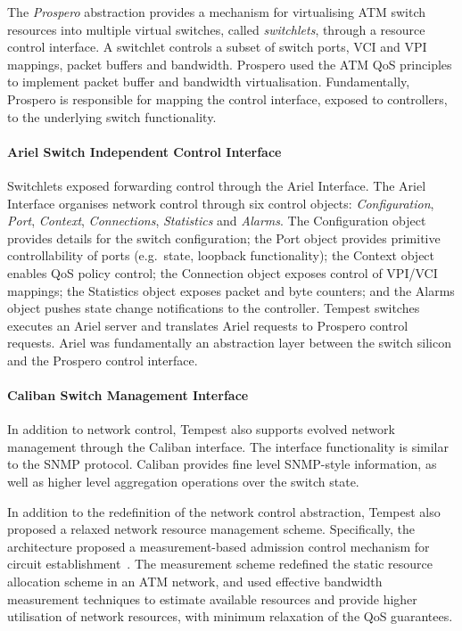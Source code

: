 The \emph{Prospero} abstraction provides a mechanism for virtualising ATM switch
resources into multiple virtual switches, called \emph{switchlets}, through a
resource control interface.  A switchlet controls a subset of switch ports,
VCI and VPI mappings, packet buffers and bandwidth. Prospero used the ATM QoS
principles to implement packet buffer and bandwidth virtualisation.
Fundamentally, Prospero is responsible for mapping the control interface, exposed to
controllers, to the underlying switch functionality. 

\paragraph{Ariel Switch Independent Control Interface} 

Switchlets exposed forwarding control through the Ariel Interface. The Ariel
Interface organises network control through six control objects:
\emph{Configuration}, \emph{Port}, \emph{Context}, {\it Connections},
\emph{Statistics} and \emph{Alarms}.  The Configuration object provides details
for the switch configuration; the Port object provides primitive controllability
of ports (e.g.~state, loopback functionality); the Context object enables QoS
policy control; the Connection object exposes control of VPI/VCI mappings; the
Statistics object exposes packet and byte counters; and the Alarms object pushes
state change notifications to the controller. Tempest switches executes an Ariel
server and translates Ariel requests to Prospero control requests. Ariel
was fundamentally an abstraction layer between the switch silicon and the
Prospero control interface. 

\paragraph{Caliban Switch Management Interface}

In addition to network control, Tempest also supports evolved network
management through the Caliban interface. The interface functionality is
similar to the SNMP protocol. Caliban provides fine level SNMP-style
information, as well as higher level aggregation operations over the switch
state. 

In addition to the redefinition of the network control abstraction, Tempest also
proposed a relaxed network resource management scheme.  Specifically, the
architecture proposed a measurement-based admission control mechanism for
circuit establishment~. The measurement scheme redefined the
static resource allocation scheme in an ATM network, and used effective bandwidth
measurement techniques to estimate available resources and provide higher
utilisation of network resources, with minimum relaxation of the QoS guarantees. 

